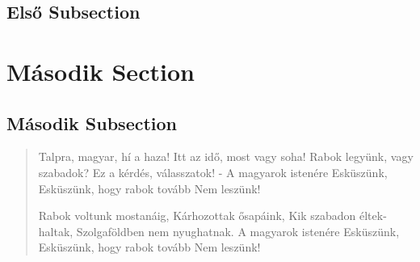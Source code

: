\documentclass{article}
\begin{document}
\subsection{Első Subsection}
\quote{\hulipsum[2]}
\section{Második Section}
\subsection{Második Subsection}
\quotation{\blindtext[2]}
\clearpage
\begin{verse}
Talpra, magyar, hí a haza!
Itt az idő, most vagy soha!
Rabok legyünk, vagy szabadok?
Ez a kérdés, válasszatok! -
A magyarok istenére
Esküszünk,
Esküszünk, hogy rabok tovább
Nem leszünk!

Rabok voltunk mostanáig,
Kárhozottak ősapáink,
Kik szabadon éltek-haltak,
Szolgaföldben nem nyughatnak.
A magyarok istenére
Esküszünk,
Esküszünk, hogy rabok tovább
Nem leszünk!


\end{verse}
\end{document}
